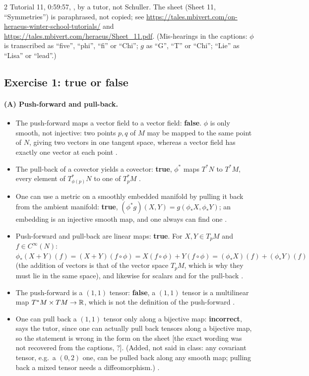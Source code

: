 \begin{paracol}{2}
Tutorial 11, 0:59:57, , by a tutor, not Schuller. The sheet (Sheet 11, ``Symmetries'') is paraphrased, not copied; see \url{https://tales.mbivert.com/on-heraeus-winter-school-tutorials/} and \url{https://tales.mbivert.com/heraeus/Sheet_11.pdf}. (Mis-hearings in the captions: $\phi$ is transcribed as ``five'', ``phi'', ``fi'' or ``Chi''; $g$ as ``G'', ``T'' or ``Chi''; ``Lie'' as ``Lisa'' or ``lead''.)

\subsection*{Exercise 1: true or false}

\paragraph{(A) Push-forward and pull-back.}
\begin{itemize}
  \item The push-forward maps a vector field to a vector field: \textbf{false}. $\phi$ is only smooth, not injective: two points $p,q$ of $M$ may be mapped to the same point of $N$, giving two vectors in one tangent space, whereas a vector field has exactly one vector at each point .
  \item The pull-back of a covector yields a covector: \textbf{true}, $\phi^*$ maps $T^*N$ to $T^*M$, every element of $T^*_{\phi(p)}N$ to one of $T^*_pM$ .
  \item One can use a metric on a smoothly embedded manifold by pulling it back from the ambient manifold: \textbf{true}, $(\phi^*g)(X,Y)=g(\phi_*X,\phi_*Y)$; an embedding is an injective smooth map, and one always can find one .
  \item Push-forward and pull-back are linear maps: \textbf{true}. For $X,Y\in T_pM$ and $f\in C^\infty(N)$: $\phi_*(X+Y)(f)=(X+Y)(f\circ\phi)=X(f\circ\phi)+Y(f\circ\phi)=(\phi_*X)(f)+(\phi_*Y)(f)$ (the addition of vectors is that of the vector space $T_pM$, which is why they must lie in the same space), and likewise for scalars and for the pull-back .
  \item The push-forward is a $(1,1)$ tensor: \textbf{false}, a $(1,1)$ tensor is a multilinear map $T^*M\times TM\to\mathbb{R}$, which is not the definition of the push-forward .
  \item One can pull back a $(1,1)$ tensor only along a bijective map: \textbf{incorrect}, says the tutor, since one can actually pull back tensors along a bijective map, so the statement is wrong in the form on the sheet [the exact wording was not recovered from the captions, ?]. (Added, not said in class: any covariant tensor, e.g.\ a $(0,2)$ one, can be pulled back along any smooth map; pulling back a mixed tensor needs a diffeomorphism.) .
\end{itemize}


\end{paracol}
